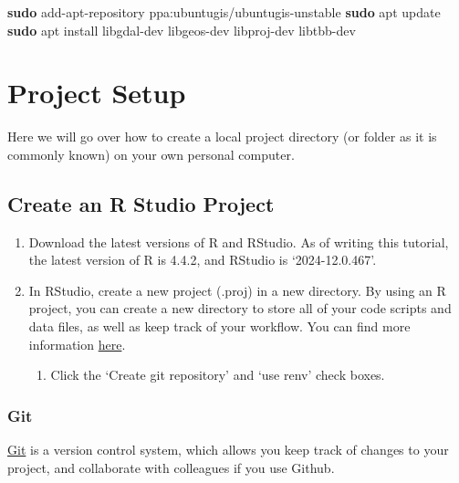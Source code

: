 \documentclass[
]{book}
\newenvironment{Shaded}{\begin{snugshade}}{\end{snugshade}}
\newcommand{\FunctionTok}[1]{\textcolor[rgb]{0.13,0.29,0.53}{\textbf{#1}}}
\newcommand{\NormalTok}[1]{#1}
\providecommand{\tightlist}{%
  \setlength{\itemsep}{0pt}\setlength{\parskip}{0pt}}
\begin{document}
\begin{Shaded}
\begin{Highlighting}[]
\FunctionTok{sudo}\NormalTok{ add{-}apt{-}repository ppa:ubuntugis/ubuntugis{-}unstable}
\FunctionTok{sudo}\NormalTok{ apt update}
\FunctionTok{sudo}\NormalTok{ apt install libgdal{-}dev libgeos{-}dev libproj{-}dev libtbb{-}dev}
\end{Highlighting}
\end{Shaded}

\chapter{Project Setup}\label{project-setup}

Here we will go over how to create a local project directory (or folder as it is commonly known) on your own personal computer.

\section{Create an R Studio Project}\label{create-an-r-studio-project}

\begin{enumerate}
\def\labelenumi{\arabic{enumi}.}
\item
  Download the latest versions of R and RStudio. As of writing this tutorial, the latest version of R is 4.4.2, and RStudio is `2024-12.0.467'.
\item
  In RStudio, create a new project (.proj) in a new directory. By using an R project, you can create a new directory to store all of your code scripts and data files, as well as keep track of your workflow. You can find more information \href{https://support.posit.co/hc/en-us/articles/200526207-Using-RStudio-Projects}{here}.

  \begin{enumerate}
  \def\labelenumii{\alph{enumii}.}
  \tightlist
  \item
    Click the `Create git repository' and `use renv' check boxes.
  \end{enumerate}
\end{enumerate}

\subsection{Git}\label{git}

\href{https://git-scm.com/}{Git} is a version control system, which allows you keep track of changes to your project, and collaborate with colleagues if you use Github.
\end{document}
